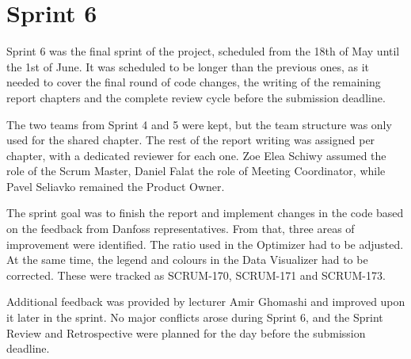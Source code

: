 \section{Sprint 6}
\label{sec:sprint6}

Sprint 6 was the final sprint of the project, scheduled from the 18th of May until the 1st of June. It was scheduled to be longer than the previous ones, as it needed to cover the final round of code changes, the writing of the remaining report chapters and the complete review cycle before the submission deadline.

The two teams from Sprint 4 and 5 were kept, but the team structure was only used for the shared chapter. The rest of the report writing was assigned per chapter, with a dedicated reviewer for each one. Zoe Elea Schiwy assumed the role of the Scrum Master, Daniel Falat the role of Meeting Coordinator, while Pavel Seliavko remained the Product Owner.

The sprint goal was to finish the report and implement changes in the code based on the feedback from Danfoss representatives. From that, three areas of improvement were identified. The ratio used in the Optimizer had to be adjusted. At the same time, the legend and colours in the Data Visualizer had to be corrected. These were tracked as SCRUM-170, SCRUM-171 and SCRUM-173.

Additional feedback was provided by lecturer Amir Ghomashi and improved upon it later in the sprint. No major conflicts arose during Sprint 6, and the Sprint Review and Retrospective were planned for the day before the submission deadline.